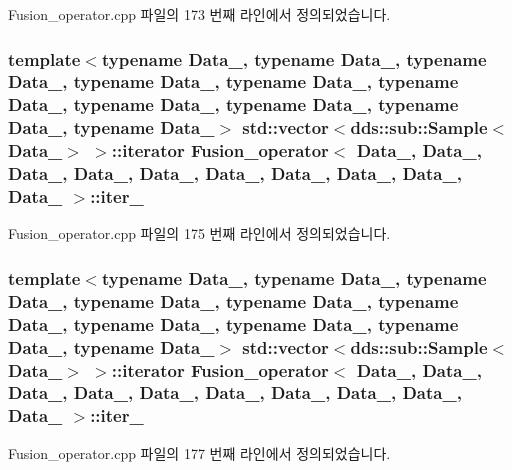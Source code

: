 Fusion\+\_\+operator.\+cpp 파일의 173 번째 라인에서 정의되었습니다.

\subsubsection[{\texorpdfstring{iter\+\_\+7}{iter_7}}]{\setlength{\rightskip}{0pt plus 5cm}template$<$typename Data\+\_, typename Data\+\_, typename Data\+\_, typename Data\+\_, typename Data\+\_, typename Data\+\_, typename Data\+\_, typename Data\+\_, typename Data\+\_, typename Data\+\_$>$ std\+::vector$<$dds\+::sub\+::\+Sample$<$Data\+\_$>$ $>$\+::iterator {\bf Fusion\+\_\+operator}$<$ Data\+\_, Data\+\_, Data\+\_, Data\+\_, Data\+\_, Data\+\_, Data\+\_, Data\+\_, Data\+\_, Data\+\_ $>$\+::iter\+\_}\hypertarget{classFusion__operator_a010f79ae83cd86608e81475c4b021104}{}\label{classFusion__operator_a010f79ae83cd86608e81475c4b021104}


Fusion\+\_\+operator.\+cpp 파일의 175 번째 라인에서 정의되었습니다.

\subsubsection[{\texorpdfstring{iter\+\_\+8}{iter_8}}]{\setlength{\rightskip}{0pt plus 5cm}template$<$typename Data\+\_, typename Data\+\_, typename Data\+\_, typename Data\+\_, typename Data\+\_, typename Data\+\_, typename Data\+\_, typename Data\+\_, typename Data\+\_, typename Data\+\_$>$ std\+::vector$<$dds\+::sub\+::\+Sample$<$Data\+\_$>$ $>$\+::iterator {\bf Fusion\+\_\+operator}$<$ Data\+\_, Data\+\_, Data\+\_, Data\+\_, Data\+\_, Data\+\_, Data\+\_, Data\+\_, Data\+\_, Data\+\_ $>$\+::iter\+\_}\hypertarget{classFusion__operator_a472aa52f1d6fb1646283d5d955a13ae1}{}\label{classFusion__operator_a472aa52f1d6fb1646283d5d955a13ae1}


Fusion\+\_\+operator.\+cpp 파일의 177 번째 라인에서 정의되었습니다.

